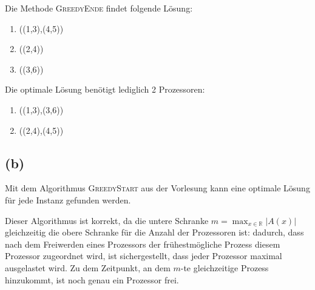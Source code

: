 \documentclass[a4paper,12pt]{article}
\begin{document}
\noindent Die Methode \textsc{GreedyEnde} findet folgende Lösung:
\begin{enumerate}[itemsep=-1mm,leftmargin=30mm,label=Prozessor \arabic*:]
\item ((1,3),(4,5))
\item ((2,4))
\item ((3,6))
\end{enumerate}

\noindent Die optimale Lösung benötigt lediglich 2 Prozessoren:
\begin{enumerate}[itemsep=-1mm,leftmargin=30mm,label=Prozessor \arabic*:]
\item ((1,3),(3,6))
\item ((2,4),(4,5))
\end{enumerate}

\subsection*{(b)}
Mit dem Algorithmus \textsc{GreedyStart} aus der Vorlesung kann eine optimale Lösung für jede Instanz gefunden werden.

Dieser Algorithmus ist korrekt, da die untere Schranke $m=\max_{x\in\mathbb{R}}|A(x)|$ gleichzeitig die obere Schranke für die Anzahl der Prozessoren ist: dadurch, dass nach dem Freiwerden eines Prozessors der frühestmögliche Prozess diesem Prozessor zugeordnet wird, ist sichergestellt, dass jeder Prozessor maximal ausgelastet wird. Zu dem Zeitpunkt, an dem $m$-te gleichzeitige Prozess hinzukommt, ist noch genau ein Prozessor frei.
\end{document}
